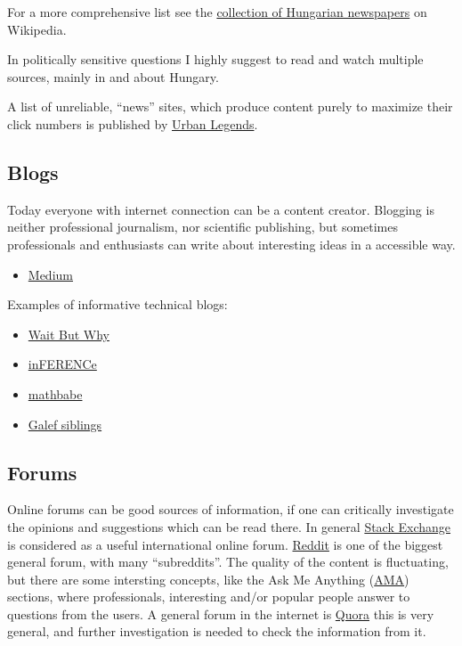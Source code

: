 \documentclass{article}
\begin{document}
For a more comprehensive list see the \href{https://en.wikipedia.org/wiki/List_of_newspapers_in_Hungary}{collection of Hungarian newspapers} on Wikipedia.

In politically sensitive questions I highly suggest to read and watch multiple sources, mainly in and about Hungary.

A list of unreliable, ``news'' sites, which produce content purely to maximize their click numbers is published by \href{https://www.urbanlegends.hu/2020/01/megteveszto-magyar-hiroldalak-listaja-2020/}{Urban Legends}.

\subsection{Blogs}

Today everyone with internet connection can be a content creator. Blogging is neither professional journalism, nor scientific publishing, but sometimes professionals and enthusiasts can write about interesting ideas in a accessible way. 

\begin{itemize}
    \item \href{https://medium.com/}{Medium}
\end{itemize}

Examples of informative technical blogs:

\begin{itemize}
    \item \href{https://waitbutwhy.com/}{Wait But Why}
    \item \href{https://www.inference.vc/}{inFERENCe}
    \item \href{https://mathbabe.org/}{mathbabe}
    \item \href{https://jessegalef.com/}{Galef siblings}
\end{itemize}

\subsection{Forums}

Online forums can be good sources of information, if one can critically investigate the opinions and suggestions which can be read there. In general \href{https://stackexchange.com/sites#}{Stack Exchange} is considered as a useful international online forum.
\href{https://www.reddit.com/}{Reddit} is one of the biggest general forum, with many ``subreddits''. The quality of the content is fluctuating, but there are some intersting concepts, like the Ask Me Anything (\href{https://www.reddit.com/r/AMA/}{AMA}) sections, where professionals, interesting and/or popular people answer to questions from the users.
A general forum in the internet is \href{https://www.quora.com/Where-is-the-list-of-all-the-topics-on-Quora}{Quora} this is very general, and further investigation is needed to check the information from it.
\end{document}

